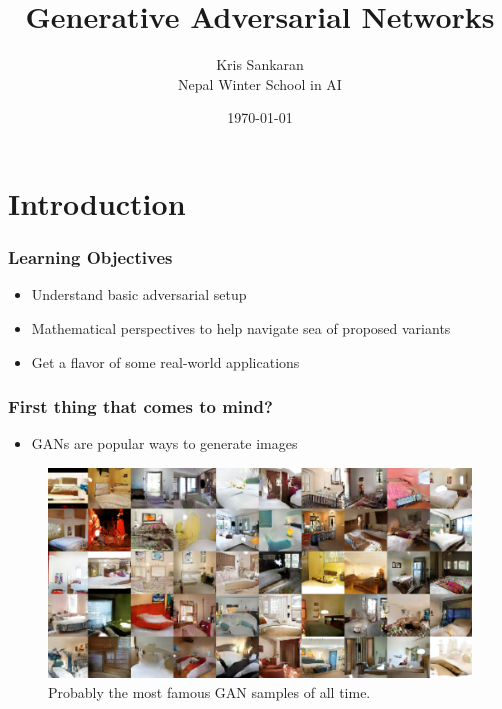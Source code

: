 \documentclass[10pt,mathserif]{beamer}
\title{\large \bfseries Generative Adversarial Networks}
\author{Kris Sankaran\\[3ex]
Nepal Winter School in AI}
\date{\today}
\begin{document}
\frame{
  \thispagestyle{empty}
  \titlepage
}

\section{Introduction}

\begin{frame}
  \frametitle{Learning Objectives}
 \begin{itemize}
  \item Understand basic adversarial setup
  \item Mathematical perspectives to help navigate sea of proposed variants
  \item Get a flavor of some real-world applications
 \end{itemize}
\end{frame}

\begin{frame}
  \frametitle{First thing that comes to mind?}
\begin{itemize}
\item GANs are popular ways to generate images
\end{itemize}
\begin{figure}[ht]
  \centering
  \includegraphics[width=0.7\paperwidth]{figure/gan_example}
  \caption{Probably the most famous GAN samples of all
    time. \citep{radford2015unsupervised} \label{fig:gan_example} }
\end{figure}
\end{frame}
\end{document}
